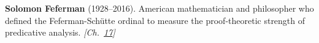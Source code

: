 \textbf{Solomon Feferman} (1928–2016). American mathematician and philosopher who defined the Feferman-Sch\"{u}tte ordinal to measure the proof-theoretic strength of predicative analysis. \emph{[Ch.~\hyperref[ch:bignumbers]{17}]}


